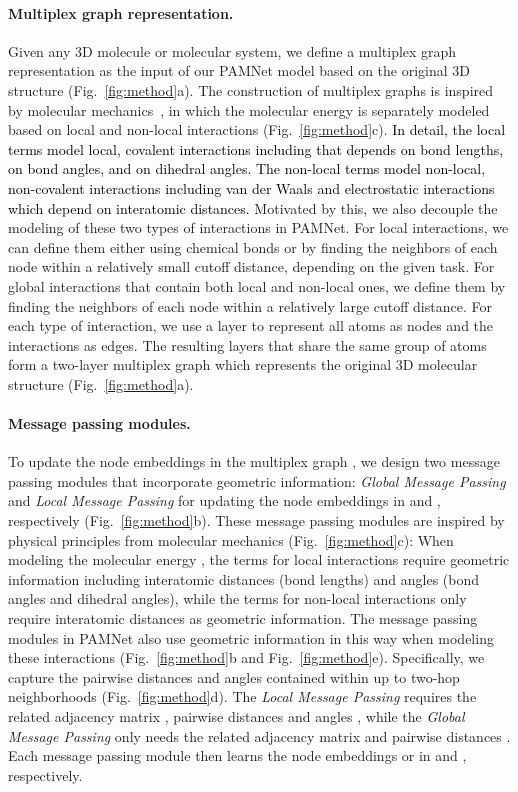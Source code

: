 \documentclass[fleqn,10pt]{wlscirep}
\newcommand{\method}{PAMNet\xspace}
\begin{document}
\paragraph{Multiplex graph representation.}
Given any 3D molecule or molecular system, we define a multiplex graph representation as the input of our \method model based on the original 3D structure (Fig.~\ref{fig:method}a). The construction of multiplex graphs is inspired by molecular mechanics~\cite{schlick2010molecular}, in which the molecular energy  is separately modeled based on local and non-local interactions (Fig.~\ref{fig:method}c). \textcolor{black}{In detail, the local terms  model local, covalent interactions including  that depends on bond lengths,  on bond angles, and  on dihedral angles. The non-local terms  model non-local, non-covalent interactions including van der Waals and electrostatic interactions which depend on interatomic distances.} Motivated by this, we also decouple the modeling of these two types of interactions in \method. For local interactions, we can define them either using chemical bonds or by finding the neighbors of each node within a relatively small cutoff distance, depending on the given task. For global interactions that contain both local and non-local ones, we define them by finding the neighbors of each node within a relatively large cutoff distance. For each type of interaction, we use a layer to represent all atoms as nodes and the interactions as edges. The resulting layers that share the same group of atoms form a two-layer multiplex graph  which represents the original 3D molecular structure (Fig.~\ref{fig:method}a).

\paragraph{Message passing modules.}
To update the node embeddings in the multiplex graph , we design two message passing modules that incorporate geometric information: \textit{Global Message Passing} and \textit{Local Message Passing} for updating the node embeddings in  and , respectively (Fig.~\ref{fig:method}b). These message passing modules are inspired by physical principles from molecular mechanics (Fig.~\ref{fig:method}c): When modeling the molecular energy , the terms for local interactions require geometric information including interatomic distances (bond lengths) and angles (bond angles and dihedral angles), while the terms for non-local interactions only require interatomic distances as geometric information. The message passing modules in \method also use geometric information in this way when modeling these interactions (Fig.~\ref{fig:method}b and Fig.~\ref{fig:method}e). Specifically, we capture the pairwise distances and angles contained within up to two-hop neighborhoods (Fig.~\ref{fig:method}d). The \textit{Local Message Passing} requires the related adjacency matrix , pairwise distances  and angles , while the \textit{Global Message Passing} only needs the related adjacency matrix  and pairwise distances . Each message passing module then learns the node embeddings  or  in  and , respectively.
\end{document}
